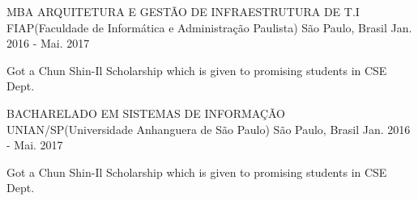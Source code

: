 

\begin{cventries}

  \cventry
    {MBA ARQUITETURA E GESTÃO DE INFRAESTRUTURA DE T.I} %
    {FIAP(Faculdade de Informática e Administração Paulista)} %
    {São Paulo, Brasil} %
    {Jan. 2016 - Mai. 2017} %
    {
      \begin{cvitems} %
        \item {Got a Chun Shin-Il Scholarship which is given to promising students in CSE Dept.}
      \end{cvitems}
    }
  
  \cventry
    {BACHARELADO EM SISTEMAS DE INFORMAÇÃO} %
    {UNIAN/SP(Universidade Anhanguera de São Paulo)} %
    {São Paulo, Brasil} %
    {Jan. 2016 - Mai. 2017} %
    {
      \begin{cvitems} %
        \item {Got a Chun Shin-Il Scholarship which is given to promising students in CSE Dept.}
      \end{cvitems}
    }

\end{cventries}
